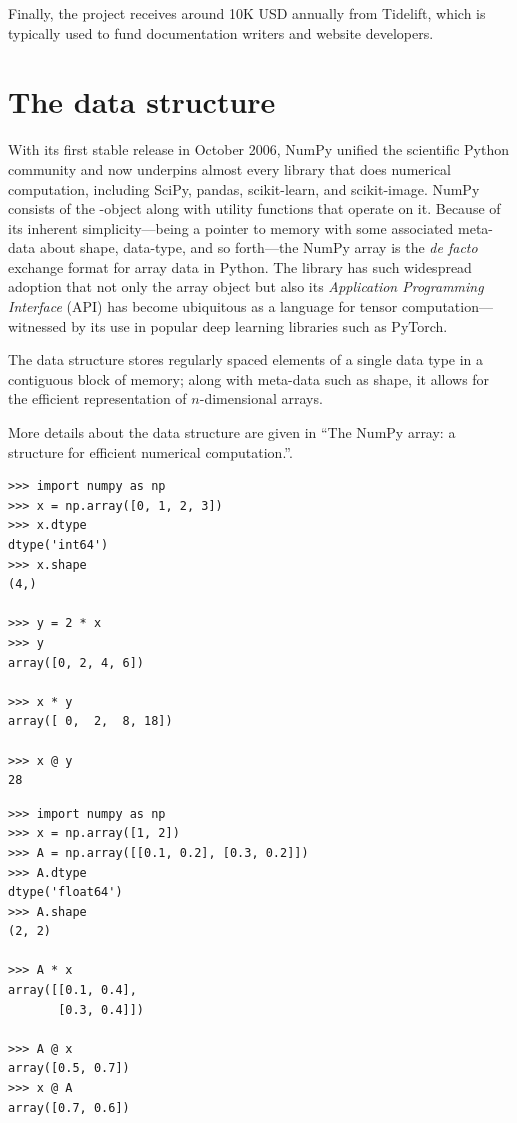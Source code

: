 Finally, the project receives around 10K USD annually from Tidelift, which is
typically used to fund documentation writers and website developers.

\section{The  data structure}


With its first stable release in October 2006, NumPy unified
the scientific Python community and now underpins almost every library
that does numerical computation, including SciPy\cite{virtanen2019scipy},
pandas\cite{mckinney-proc-scipy-2010}, scikit-learn\cite{pedregosa2011scikit},
and scikit-image\cite{vanderwalt2014scikit}.
NumPy consists of the -object along with utility functions that
operate on it.
Because of its inherent simplicity---being a pointer to memory with some
associated meta-data about shape, data-type, and so forth---the NumPy array is
the {\it de facto} exchange format for array data in Python.
The library has such widespread adoption that not only the array object but also its
{\it Application Programming Interface} (API) has become ubiquitous as
a language for tensor computation---witnessed by its use in popular
deep learning libraries such as PyTorch\cite{pytorch}.

The  data structure stores regularly spaced elements of a single
data type in a contiguous block of memory; along with meta-data such as shape,
it allows for the efficient representation of $n$-dimensional arrays.


More details about the data structure are given in ``The NumPy array:
a structure for efficient numerical computation.''\cite{vanderwalt2011numpy}.


\begin{lstlisting}
>>> import numpy as np
>>> x = np.array([0, 1, 2, 3])
>>> x.dtype
dtype('int64')
>>> x.shape
(4,)

>>> y = 2 * x
>>> y
array([0, 2, 4, 6])

>>> x * y
array([ 0,  2,  8, 18])

>>> x @ y
28
\end{lstlisting}

\begin{lstlisting}
>>> import numpy as np
>>> x = np.array([1, 2])
>>> A = np.array([[0.1, 0.2], [0.3, 0.2]])
>>> A.dtype 
dtype('float64')
>>> A.shape
(2, 2)

>>> A * x
array([[0.1, 0.4],
       [0.3, 0.4]])

>>> A @ x
array([0.5, 0.7])
>>> x @ A
array([0.7, 0.6])
\end{lstlisting}

